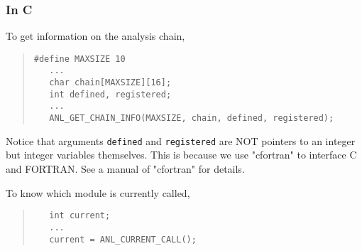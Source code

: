 \subsubsection{In C}
To get information on the analysis chain,
\begin{quote}\baselineskip 3.2mm\begin{verbatim}
#define MAXSIZE 10
   ...
   char chain[MAXSIZE][16];
   int defined, registered;
   ...
   ANL_GET_CHAIN_INFO(MAXSIZE, chain, defined, registered);
\end{verbatim}\end{quote}

Notice that
arguments {\tt defined} and {\tt registered} are NOT pointers to an integer
but integer variables themselves.
This is
because we use "cfortran" to interface C and FORTRAN.
See a manual of "cfortran"\cite{cfortran} for details.

To know which module is currently called,
\begin{quote}\baselineskip 3.2mm\begin{verbatim}
   int current;
   ...
   current = ANL_CURRENT_CALL();
\end{verbatim}\end{quote}
